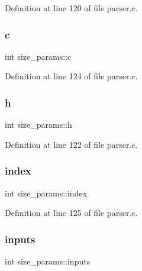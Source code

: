 Definition at line 120 of file parser.\+c.

\mbox{\label{structsize__params_aa260a97f277fe40b200756374ffe410d}} 
\subsubsection{\texorpdfstring{c}{c}}
{\footnotesize\ttfamily int size\+\_\+params\+::c}



Definition at line 124 of file parser.\+c.

\mbox{\label{structsize__params_af2cdbb6a29f9aa108d3132fb36895769}} 
\subsubsection{\texorpdfstring{h}{h}}
{\footnotesize\ttfamily int size\+\_\+params\+::h}



Definition at line 122 of file parser.\+c.

\mbox{\label{structsize__params_a1cc9cfac9ae1198cb6e3683ca228b4e7}} 
\subsubsection{\texorpdfstring{index}{index}}
{\footnotesize\ttfamily int size\+\_\+params\+::index}



Definition at line 125 of file parser.\+c.

\mbox{\label{structsize__params_ababcd3a740ca14059c55124b38bd1adf}} 
\subsubsection{\texorpdfstring{inputs}{inputs}}
{\footnotesize\ttfamily int size\+\_\+params\+::inputs}



